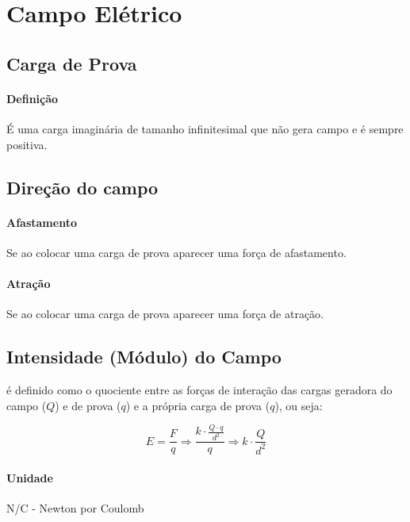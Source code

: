 \section{Campo Elétrico}\label{campo-eluxe9trico}

\subsection{Carga de Prova}\label{carga-de-prova}

\paragraph{Definição}\label{definiuxe7uxe3o}

É uma carga imaginária de tamanho infinitesimal que não gera campo e é
sempre positiva.

\subsection{Direção do campo}\label{direuxe7uxe3o-do-campo}

\paragraph{Afastamento}\label{afastamento}

Se ao colocar uma carga de prova aparecer uma força de afastamento.

\paragraph{Atração}\label{atrauxe7uxe3o}

Se ao colocar uma carga de prova aparecer uma força de atração.

\subsection{Intensidade (Módulo) do
Campo}\label{intensidade-muxf3dulo-do-campo}

é definido como o quociente entre as forças de interação das cargas
geradora do campo ($Q$) e de prova ($q$) e a própria carga de prova
($q$), ou seja:

\[
E = \frac{F}{q} \Rightarrow \frac{k \cdot \frac{Q \cdot q}{d^2}}{q}
  \Rightarrow k \cdot \frac{Q}{d^2}
\]

\paragraph{Unidade}\label{unidade}

N/C - Newton por Coulomb
